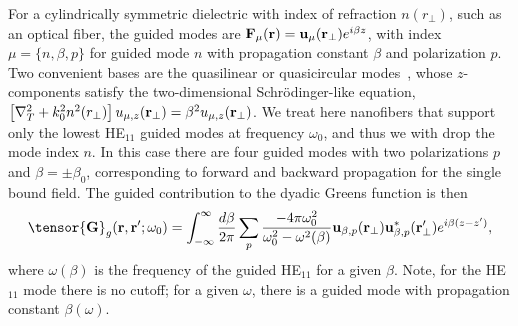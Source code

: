 \documentclass[preprint,aps,pra,onecolumn]{revtex4-1} %
\begin{document}
For a cylindrically symmetric dielectric with index of refraction $n(r_\perp)$, such as an optical fiber, the guided modes are $\mathbf{F}_\mu (\mathbf{r}) = \mathbf{u}_\mu (\mathbf{r}_\perp) e^{i\beta z}$, with index $\mu=\{n, \beta, p\}$ for guided mode $n$ with propagation constant $\beta$ and polarization $p$.  Two convenient bases are the quasilinear or quasicircular modes~\cite{kien_field_2004}, whose $z$-components satisfy the two-dimensional Schr\"{o}dinger-like equation, $\left[\nabla_T^2 +k_0^2 
n^2(r_\perp) \right] u_{\mu,z} (\mathbf{r}_\perp) = \beta^2 u_{\mu,z} (\mathbf{r}_\perp)$.  We treat here nanofibers that support only the lowest HE$_{11}$ guided modes at frequency $\omega_0$, and thus we with 
drop the mode index $n$.  In this case there are four guided modes with two polarizations $p$ and 
$\beta = \pm \beta_0$, corresponding to forward and backward propagation for the single bound field.  
The guided contribution to the dyadic Greens function is then 
\begin{equation} \label{Eq::GreensEigenmodes}
\tensor{\mathbf{G}}_g(\br,\br'; \omega_0) = \int_{-\infty}^\infty \frac{d \beta}{2 \pi} \sum_{p} 
\frac{-4\pi\omega_0^2}{\omega_0^2-\omega^2(\beta)} \mathbf{u}_{\beta,p} (\br_\perp)\mathbf{u}^*_{\beta,p} 
(\br_{\perp}^\prime) e^{i\beta(z-z')},
\end{equation}
where $ \omega(\beta)$ is the frequency of the guided HE$_{11}$ for a given $\beta$.  Note, for the 
HE$_{11}$ mode there is no cutoff; for a given $\omega$, there is a guided mode with propagation 
constant $\beta(\omega)$.  
\end{document}
